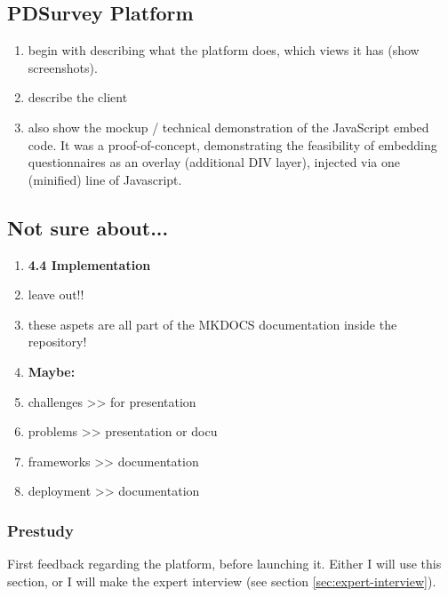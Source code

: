 \subsection{PDSurvey Platform}

\begin{enumerate}
\item begin with describing what the platform does, which views it has (show screenshots).
\item describe the client
\item also show the mockup / technical demonstration of the JavaScript embed code. It was a proof-of-concept, demonstrating the feasibility of embedding questionnaires as an overlay (additional DIV layer), injected via one (minified) line of Javascript. %
\end{enumerate}





\subsection{Not sure about...}

	\begin{enumerate}

	\item \textbf{4.4 Implementation}
		\item leave out!!
		\item these aspets are all part of the MKDOCS documentation inside the repository!

	\item \textbf{Maybe:}
		\item challenges		>> for presentation
		\item problems		>> presentation or docu
		\item frameworks 		>> documentation
		\item deployment		>> documentation

	\end{enumerate}


	\subsubsection{Prestudy}

	First feedback regarding the platform, before launching it. Either I will use this section, or I will make the expert interview (see section \ref{sec:expert-interview}).

